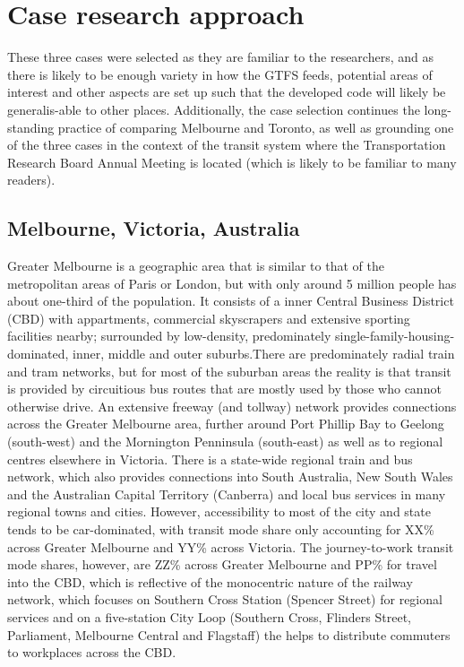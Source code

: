 \documentclass[]{tufte-book}
\begin{document}
\hypertarget{case-research-approach}{%
\section{Case research approach}\label{case-research-approach}}

These three cases were selected as they are familiar to the researchers,
and as there is likely to be enough variety in how the GTFS feeds,
potential areas of interest and other aspects are set up such that the
developed code will likely be generalis-able to other places.
Additionally, the case selection continues the long-standing practice of
comparing Melbourne and Toronto, as well as grounding one of the three
cases in the context of the transit system where the Transportation
Research Board Annual Meeting is located (which is likely to be familiar
to many readers).

\hypertarget{melbourne-victoria-australia}{%
\subsection{Melbourne, Victoria,
Australia}\label{melbourne-victoria-australia}}

Greater Melbourne is a geographic area that is similar to that of the
metropolitan areas of Paris or London, but with only around 5 million
people has about one-third of the population. It consists of a inner
Central Business District (CBD) with appartments, commercial skyscrapers
and extensive sporting facilities nearby; surrounded by low-density,
predominately single-family-housing-dominated, inner, middle and outer
suburbs.There are predominately radial train and tram networks, but for
most of the suburban areas the reality is that transit is provided by
circuitious bus routes that are mostly used by those who cannot
otherwise drive. An extensive freeway (and tollway) network provides
connections across the Greater Melbourne area, further around Port
Phillip Bay to Geelong (south-west) and the Mornington Penninsula
(south-east) as well as to regional centres elsewhere in Victoria. There
is a state-wide regional train and bus network, which also provides
connections into South Australia, New South Wales and the Australian
Capital Territory (Canberra) and local bus services in many regional
towns and cities. However, accessibility to most of the city and state
tends to be car-dominated, with transit mode share only accounting for
XX\% across Greater Melbourne and YY\% across Victoria. The
journey-to-work transit mode shares, however, are ZZ\% across Greater
Melbourne and PP\% for travel into the CBD, which is reflective of the
monocentric nature of the railway network, which focuses on Southern
Cross Station (Spencer Street) for regional services and on a
five-station City Loop (Southern Cross, Flinders Street, Parliament,
Melbourne Central and Flagstaff) the helps to distribute commuters to
workplaces across the CBD.
\end{document}

